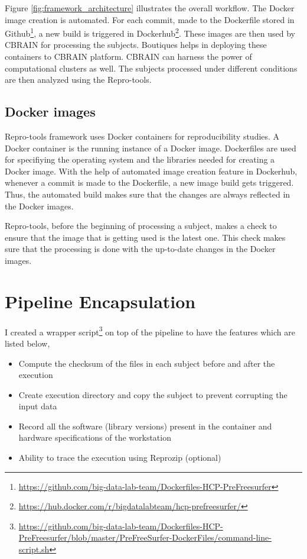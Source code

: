 Figure \ref{fig:framework_architecture} illustrates the overall workflow. The Docker image creation is automated. For each commit, made to the Dockerfile stored in Github\footnote{\url{https://github.com/big-data-lab-team/Dockerfiles-HCP-PreFreesurfer}}, a new build is triggered in Dockerhub\footnote{\url{https://hub.docker.com/r/bigdatalabteam/hcp-prefreesurfer/}}. These images are then used by CBRAIN for processing the subjects. Boutiques helps in deploying these containers to CBRAIN platform. CBRAIN can harness the power of computational clusters as well. The subjects processed under different conditions are then analyzed using the Repro-tools.

\subsection{Docker images}
Repro-tools framework uses Docker containers for reproducibility studies. A Docker container is the running instance of a Docker image. Dockerfiles are used for specifiying the operating system and the libraries needed for creating a Docker image. With the help of automated image creation feature in Dockerhub, whenever a commit is made to the Dockerfile, a new image build gets triggered. Thus, the automated build makes sure that the changes are always reflected in the Docker images. 

Repro-tools, before the beginning of processing a subject, makes a check to ensure that the image that is getting used is the latest one. This check makes sure that the processing is done with the up-to-date changes in the Docker images.

\section{Pipeline Encapsulation}
I created a wrapper script\footnote{\url{https://github.com/big-data-lab-team/Dockerfiles-HCP-PreFreesurfer/blob/master/PreFreeSurfer-DockerFiles/command-line-script.sh}} on top of the pipeline to have the features which are listed below,
\begin{itemize}
  \item Compute the checksum of the files in each subject before and after the execution
  \item Create execution directory and copy the subject to prevent corrupting the input data
  \item Record all the software (library versions) present in the container and hardware specifications of the workstation
  \item Ability to trace the execution using Reprozip (optional)
\end{itemize}

